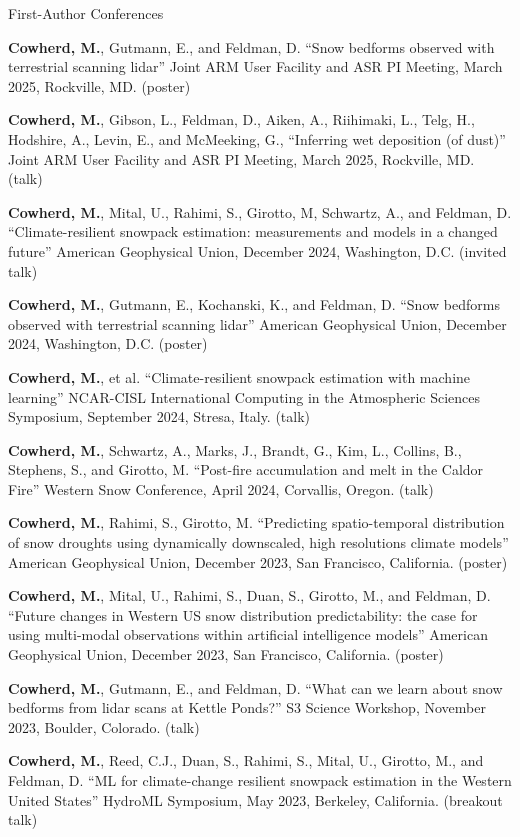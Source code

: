 \documentclass{cv}
\begin{document}
\begin{cSection}{First-Author Conferences}
\item \textbf{Cowherd, M.}, Gutmann, E., and Feldman, D. ``Snow bedforms observed with terrestrial scanning lidar'' Joint ARM User Facility and ASR PI Meeting, March 2025, Rockville, MD. (poster)
\item \textbf{Cowherd, M.}, Gibson, L., Feldman, D., Aiken, A., Riihimaki, L., Telg, H., Hodshire, A., Levin, E., and McMeeking, G., ``Inferring wet deposition (of dust)'' Joint ARM User Facility and ASR PI Meeting, March 2025, Rockville, MD. (talk)
\item \textbf{Cowherd, M.}, Mital, U., Rahimi, S., Girotto, M, Schwartz, A., and Feldman, D.  ``Climate-resilient snowpack estimation: measurements and models in a changed future'' American Geophysical Union, December 2024, Washington, D.C. (invited talk)
\item \textbf{Cowherd, M.}, Gutmann, E., Kochanski, K., and Feldman, D.  ``Snow bedforms observed with terrestrial scanning lidar'' American Geophysical Union, December 2024, Washington, D.C. (poster)
\item \textbf{Cowherd, M.}, et al.  ``Climate-resilient snowpack estimation with machine learning'' NCAR-CISL International Computing in the Atmospheric Sciences Symposium, September 2024, Stresa, Italy. (talk)
\item \textbf{Cowherd, M.}, Schwartz, A., Marks, J., Brandt, G., Kim, L., Collins, B., Stephens, S., and Girotto, M. ``Post-fire accumulation and melt in the Caldor Fire'' Western Snow Conference, April 2024, Corvallis, Oregon. (talk)
\item \textbf{Cowherd, M.}, Rahimi, S., Girotto, M. ``Predicting spatio-temporal distribution of snow droughts using dynamically downscaled, high resolutions climate models'' American Geophysical Union, December 2023, San Francisco, California. (poster) 
\item \textbf{Cowherd, M.}, Mital, U., Rahimi, S., Duan, S., Girotto, M., and Feldman, D. ``Future changes in Western US snow distribution predictability: the case for using multi-modal observations within artificial intelligence models'' American Geophysical Union, December 2023, San Francisco, California. (poster)
\item \textbf{Cowherd, M.}, Gutmann, E., and Feldman, D. ``What can we learn about snow bedforms from lidar scans at Kettle Ponds?'' S3 Science Workshop, November 2023, Boulder, Colorado. (talk)
\item \textbf{Cowherd, M.}, Reed, C.J., Duan, S., Rahimi, S., Mital, U., Girotto, M., and Feldman, D. ``ML for climate-change resilient snowpack estimation in the Western United States'' HydroML Symposium, May 2023, Berkeley, California. (breakout talk)

\end{cSection}
\end{document}

